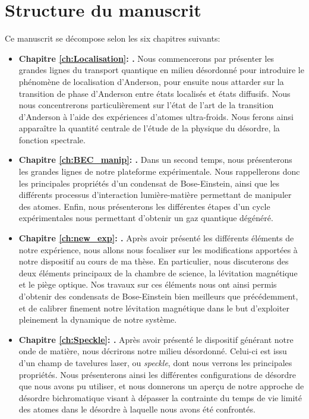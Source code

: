 \section{Structure du manuscrit}
Ce manuscrit se décompose selon les six chapitres suivants:
\begin{itemize}
\item[\textendash] \textbf{Chapitre \ref{ch:Localisation}: {\hypersetup{linkcolor=black}}.} Nous commencerons par présenter les grandes lignes du transport quantique en milieu désordonné pour introduire le phénomène de localisation d'Anderson, pour ensuite nous attarder sur la transition de phase d'Anderson entre états localisés et états diffusifs. Nous nous concentrerons particulièrement sur l'état de l'art de la transition d'Anderson à l'aide des expériences d'atomes ultra-froids.  Nous ferons ainsi apparaître la quantité centrale de l'étude de la physique du désordre, la fonction spectrale. \\

\item[\textendash] \textbf{Chapitre \ref{ch:BEC_manip}: {\hypersetup{linkcolor=black}}.} Dans un second temps, nous présenterons les grandes lignes de notre plateforme expérimentale. Nous rappellerons donc les principales propriétés d'un condensat de Bose-Einstein, ainsi que les différents processus d'interaction lumière-matière permettant de manipuler des atomes. Enfin, nous présenterons les différentes étapes d'un cycle expérimentales nous permettant d'obtenir un gaz quantique dégénéré. \\

\item[\textendash] \textbf{Chapitre \ref{ch:new_exp}: {\hypersetup{linkcolor=black}}.} Après avoir présenté les différents éléments de notre expérience, nous allons nous focaliser sur les modifications apportées à notre dispositif au cours de ma thèse. En particulier, nous discuterons des deux éléments principaux de la chambre de science, la lévitation magnétique et le piège optique. Nos travaux sur ces éléments nous ont ainsi permis d'obtenir des condensats de Bose-Einstein bien meilleurs que précédemment, et de calibrer finement notre lévitation magnétique dans le but d'exploiter pleinement la dynamique de notre système. \\

\item[\textendash] \textbf{Chapitre \ref{ch:Speckle}: {\hypersetup{linkcolor=black}}.} Après avoir présenté le dispositif générant notre onde de matière, nous décrirons notre milieu désordonné. Celui-ci est issu d'un champ de tavelures laser, ou \emph{speckle}, dont nous verrons les principales propriétés. Nous présenterons ainsi les différentes configurations de désordre que nous avons pu utiliser, et nous donnerons un aperçu de notre approche de désordre bichromatique visant à dépasser la contrainte du temps de vie limité des atomes dans le désordre à laquelle nous avons été confrontés. \\


\end{itemize}
